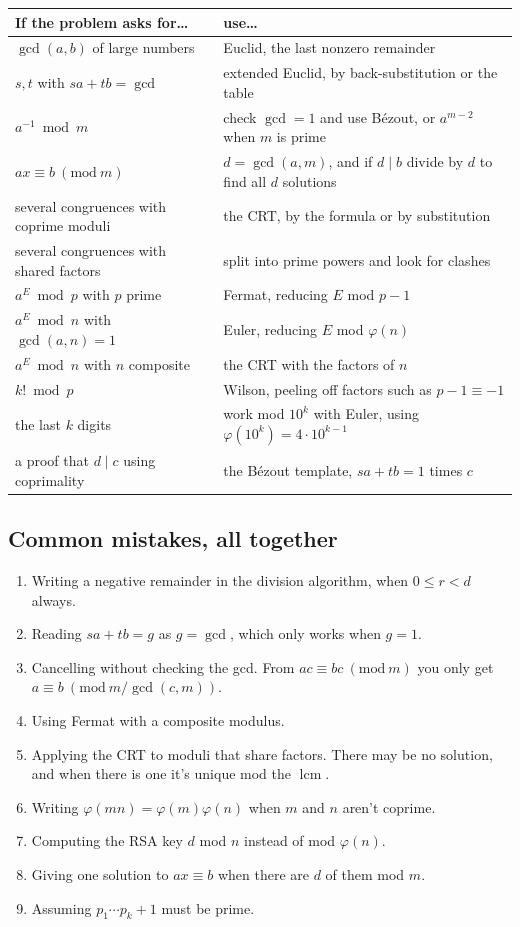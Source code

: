 \documentclass[11pt,a4paper]{article}
\theoremstyle{definition}
\newcommand{\md}[1]{\ (\mathrm{mod}\ #1)}
\DeclareMathOperator{\lcm}{lcm}
\theoremstyle{noteit}
\theoremstyle{note}
\begin{document}
\begin{center}
\renewcommand{\arraystretch}{1.35}
\begin{tabular}{p{6.3cm}p{8.3cm}}
\toprule
\textbf{If the problem asks for\dots} & \textbf{use\dots}\\
\midrule
$\gcd(a,b)$ of large numbers & Euclid, the last nonzero remainder\\
$s,t$ with $sa+tb=\gcd$ & extended Euclid, by back-substitution or the table\\
$a^{-1}\bmod m$ & check $\gcd=1$ and use Bézout, or $a^{m-2}$ when $m$ is prime\\
$ax\equiv b\md m$ & $d=\gcd(a,m)$, and if $d\mid b$ divide by $d$ to find all $d$ solutions\\
several congruences with coprime moduli & the CRT, by the formula or by substitution\\
several congruences with shared factors & split into prime powers and look for clashes\\
$a^E\bmod p$ with $p$ prime & Fermat, reducing $E$ mod $p-1$\\
$a^E\bmod n$ with $\gcd(a,n)=1$ & Euler, reducing $E$ mod $\varphi(n)$\\
$a^E\bmod n$ with $n$ composite & the CRT with the factors of $n$\\
$k!\bmod p$ & Wilson, peeling off factors such as $p-1\equiv-1$\\
the last $k$ digits & work mod $10^k$ with Euler, using $\varphi(10^k)=4\cdot10^{k-1}$\\
a proof that $d\mid c$ using coprimality & the Bézout template, $sa+tb=1$ times $c$\\
\bottomrule
\end{tabular}
\end{center}

\subsection*{Common mistakes, all together}
\begin{enumerate}
\item Writing a negative remainder in the division algorithm, when $0\le r<d$ always.
\item Reading $sa+tb=g$ as $g=\gcd$, which only works when $g=1$.
\item Cancelling without checking the gcd. From $ac\equiv bc\md m$ you only get $a\equiv b\md{m/\gcd(c,m)}$.
\item Using Fermat with a composite modulus.
\item Applying the CRT to moduli that share factors. There may be no solution, and when there is one it's unique mod the $\lcm$.
\item Writing $\varphi(mn)=\varphi(m)\varphi(n)$ when $m$ and $n$ aren't coprime.
\item Computing the RSA key $d$ mod $n$ instead of mod $\varphi(n)$.
\item Giving one solution to $ax\equiv b$ when there are $d$ of them mod $m$.
\item Assuming $p_1\cdots p_k+1$ must be prime.
\end{enumerate}
\end{document}
